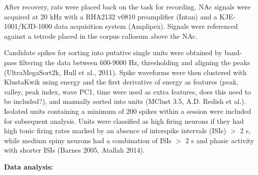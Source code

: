 \documentclass[11pt]{article}
\begin{document}
After recovery, rats were placed back on the task for recording. NAc signals were acquired at 20 kHz with a RHA2132 v0810 preamplifier (Intan) and a KJE-1001/KJD-1000 data acquisition system (Amplipex). Signals were referenced against a tetrode placed in the corpus callosum above the NAc.

Candidate spikes for sorting into putative single units were obtained by band-pass filtering the data between 600-9000 Hz, thresholding and aligning the peaks (UltraMegaSort2k, Hull et al., 2011). Spike waveforms were then clustered with KlustaKwik using energy and the first derivative of energy as features (peak, valley, peak index, wave PC1, time were used as extra features, does this need to be included?), and manually sorted into units (MClust 3.5, A.D. Redish et al.). Isolated units containing a minimum of 200 spikes within a session were included for subsequent analysis. Units were classified as high firing neurons if they had high tonic firing rates marked by an absence of interspike intervals (ISIs) $>$ 2 s, while medium spiny neurons had a combination of ISIs $>$ 2 s and phasic activity with shorter ISIs (Barnes 2005, Atallah 2014). 

{\bf Data analysis:}
\end{document}
